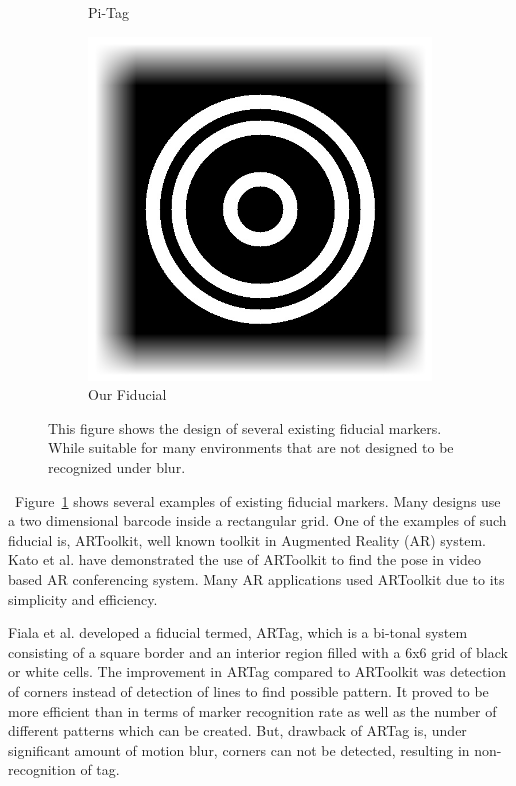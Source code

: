 \documentclass[runningheads]{llncs}
\begin{document}
\begin{figure}
\begin{subfigure}[b]{0.19\textwidth}
  Pi-Tag\cite{Pitag13}
 \end{subfigure}
 \begin{subfigure}[b]{0.19\textwidth}
  \centering
  \includegraphics[width=\linewidth]{our_fiducial}
  Our Fiducial
 \end{subfigure}
 \caption{This figure shows the design of several existing fiducial markers.  While
 suitable for many environments that are not designed to be recognized under blur.}
 \label{fig:previous_work}
\end{figure}

~Figure~\ref{fig:previous_work} shows several 
examples of existing fiducial markers.  Many designs use a two dimensional
barcode inside a rectangular grid. One of the examples of such fiducial is,
ARToolkit\cite{ARToolkit02}, well known toolkit in Augmented Reality (AR)
system. Kato et al.\cite{kato-artoolkit} have demonstrated the use of ARToolkit
to find the pose in video based AR conferencing system. Many AR applications
used ARToolkit due to its simplicity and efficiency.

Fiala et al. \cite{Fiala05} developed a fiducial termed, ARTag, which is a
bi-tonal system consisting of a square border and an interior region filled
with a 6x6 grid of black or white cells. The improvement in ARTag compared to
ARToolkit was detection of corners instead of detection of lines to find
possible pattern. It proved to be more efficient than \cite{ARToolkit02} in
terms of marker recognition rate as well as the number of different patterns
which can be created. But, drawback of ARTag is, under significant amount of
motion blur, corners can not be detected, resulting in non-recognition of tag.
\end{document}

